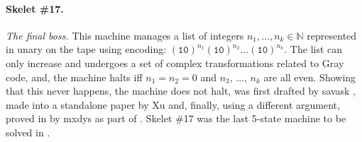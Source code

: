 
\paragraph{Skelet \#17.} \textit{The final boss.} This machine manages a list of integers $n_1, \dots, n_k \in \mathbb{N}$ represented in unary on the tape using encoding: $(\texttt{10})^{n_1} (\texttt{10})^{n_2} \dots (\texttt{10})^{n_k}$. The list can only increase and undergoes a set of complex transformations related to Gray code, and, the machine halts iff $n_1 = n_2 = 0$ and $n_3,\, \dots,\, n_k$ are all even. Showing that this never happens, \ie the machine does not halt, was first drafted by savask \cite{savaskSk17}, made into a standalone paper by Xu \cite{xu2024skelet17fifthbusy} and, finally, using a different argument, proved in \Coq by mxdys as part of \CoqBB. Skelet \#17 was the last 5-state machine to be solved in \Coq.